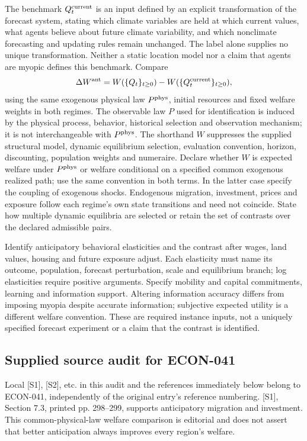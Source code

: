 \documentclass[11pt,a4paper]{article}
\begin{document}
The benchmark $Q_t^{\rm current}$ is an input defined by an explicit transformation of the forecast system, stating which climate variables are held at which current values, what agents believe about future climate variability, and which nonclimate forecasting and updating rules remain unchanged. The label alone supplies no unique transformation. Neither a static location model nor a claim that agents are myopic defines this benchmark. Compare
\[
\Delta W^{\rm ant}=W(\{Q_t\}_{t\geq0})
                  -W(\{Q_t^{\rm current}\}_{t\geq0}),
\]
using the same exogenous physical law $P^{\rm phys}$, initial resources and fixed welfare weights in both regimes. The observable law $P$ used for identification is induced by the physical process, behavior, historical selection and observation mechanism; it is not interchangeable with $P^{\rm phys}$. The shorthand $W$ suppresses the supplied structural model, dynamic equilibrium selection, evaluation convention, horizon, discounting, population weights and numeraire. Declare whether $W$ is expected welfare under $P^{\rm phys}$ or welfare conditional on a specified common exogenous realized path; use the same convention in both terms. In the latter case specify the coupling of exogenous shocks. Endogenous migration, investment, prices and exposure follow each regime's own state transitions and need not coincide. State how multiple dynamic equilibria are selected or retain the set of contrasts over the declared admissible pairs.

Identify anticipatory behavioral elasticities and the contrast after wages, land values, housing and future exposure adjust. Each elasticity must name its outcome, population, forecast perturbation, scale and equilibrium branch; log elasticities require positive arguments. Specify mobility and capital commitments, learning and information support. Altering information accuracy differs from imposing myopia despite accurate information; subjective expected utility is a different welfare convention. These are required instance inputs, not a uniquely specified forecast experiment or a claim that the contrast is identified.
\subsection*{Supplied source audit for ECON-041}
Local [S1], [S2], etc. in this audit and the references immediately below
belong to ECON-041, independently of the original entry's reference numbering.
[S1], Section 7.3, printed pp. 298--299, supports anticipatory migration and investment. This common-physical-law welfare comparison is editorial and does not assert that better anticipation always improves every region's welfare.
\end{document}
